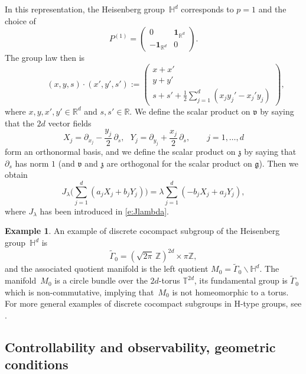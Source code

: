\documentclass[10pt]{amsart}
\newcommand{\bun}{\mathbf{1}}
\theoremstyle{plain}
\theoremstyle{definition}
\newtheorem{example}[theorem]{Example}
\def\R{{\mathbb R}}
\def\Z{{\mathbb Z}}
\def\T{{\mathbb T}}
\def\bbH{{\mathbb H}}
\begin{document}
In this representation, the Heisenberg group~$\bbH^d$ corresponds to $p=1$ and the choice of
\[
{P^{(1)}= \begin{pmatrix} 0 & \bun_{\R^d} \\ - \bun_{\R^d} & 0\end{pmatrix}}.
\]
The group law then is
\begin{equation*}
\quad \quad \quad (x,y,s) \cdot (x',y',s'):=\begin{pmatrix}
x+x'\\ y+y'\\s+s'+\frac12 \sum_{j=1}^d(x_jy_j'-x_j'y_j)
\end{pmatrix},
\end{equation*}
where $x,y,x',y'\in\R^d$ and $s,s'\in\R$. We define the scalar product on $\mathfrak v$ by saying that the $2d$ vector fields
\begin{equation}\label{def:XY}
X_j=\partial_{x_j}-\frac{y_j}{2}\,\partial_{s}, \ \ \ Y_j=\partial_{y_j}+\frac{x_j}{2}\,\partial_{s}, \qquad j=1,\ldots,d
\end{equation}
form an orthonormal basis, and we define the scalar product on $\mathfrak z$ by saying that $\partial_s$ has norm $1$ (and $\mathfrak v$ and $\mathfrak z$ are orthogonal for the scalar product on $\mathfrak g$). Then we obtain
\begin{equation*}
J_\lambda\biggl(\sum_{j=1}^d (a_jX_j+b_jY_j)\biggr)=\lambda\sum_{j=1}^d (-b_jX_j+a_jY_j),
\end{equation*}
where $J_\lambda$ has been introduced in \eqref{e:Jlambda}.

\begin{example}\label{ex:general1}
An example of discrete cocompact subgroup of the Heisenberg group~$\bbH^d$ is
\begin{equation*}%
\widetilde{\Gamma}_0=(\sqrt{2\pi}\,\Z)^{2d}\times \pi\Z,
\end{equation*}
and the associated quotient manifold is the left quotient $M_0=\widetilde{\Gamma}_0\backslash \bbH^d$. The manifold~$M_0$ is a circle bundle over the $2d$-torus $\T^{2d}$, its fundamental group is $\widetilde{\Gamma}_0$ which is non-commutative, implying that~$M_0$ is not homeomorphic to a torus.
For more general examples of discrete cocompact subgroups in H-type groups, see \cite[Chap.\,5]{CG}.
\end{example}

\subsection{Controllability and observability, geometric conditions}
\end{document}
